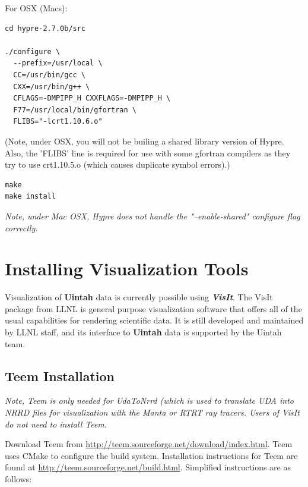 \documentclass[12pt]{article}
\begin{document}
For OSX (Macs):

\begin{verbatim}
cd hypre-2.7.0b/src

./configure \
  --prefix=/usr/local \
  CC=/usr/bin/gcc \
  CXX=/usr/bin/g++ \
  CFLAGS=-DMPIPP_H CXXFLAGS=-DMPIPP_H \
  F77=/usr/local/bin/gfortran \
  FLIBS="-lcrt1.10.6.o"

\end{verbatim}

(Note, under OSX, you will not be builing a shared library version of
Hypre.  Also, the 'FLIBS' line is required for use with some 
gfortran compilers as they try to use crt1.10.5.o (which causes
duplicate symbol errors).)

\begin{verbatim}
make
make install
\end{verbatim}

\emph{Note, under Mac OSX, Hypre does not handle the "--enable-shared" configure
  flag correctly.}

\section{Installing Visualization Tools}

Visualization of \textbf{Uintah} data is currently possible using
\textbf{\emph{VisIt}}. The VisIt package from LLNL is general purpose
visualization software that offers all of the usual capabilities for
rendering scientific data.  It is still developed and maintained by
LLNL staff, and its interface to \textbf{Uintah} data is supported by
the Uintah team.


\subsection{Teem Installation}
\label{subsec:teem}

\emph{Note, Teem is only needed for UdaToNrrd (which is used to
  translate UDA into NRRD files for visualization with the Manta or
  RTRT ray tracers.  Users of VisIt do not need to install Teem.}

Download Teem from
\url{http://teem.sourceforge.net/download/index.html}.  Teem uses
CMake to configure the build system. Installation instructions for
Teem are found at \url{http://teem.sourceforge.net/build.html}.  Simplified
instructions are as follows:
\end{document}
